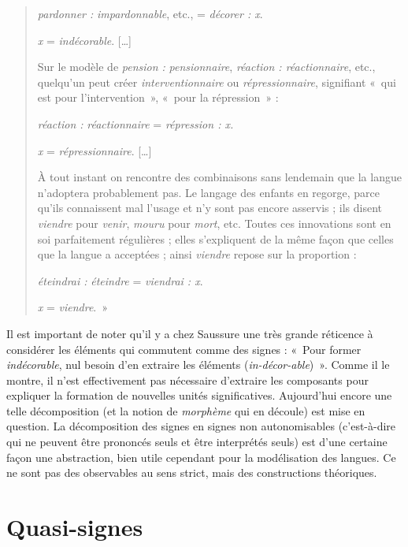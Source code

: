 {\begin{quote}
        \textit{pardonner :} \textit{impardonnable}, etc., = \textit{décorer : x}.

        \textit{x} = \textit{indécorable}. […]

    Sur le modèle de \textit{pension :} \textit{pensionnaire}, \textit{réaction : réactionnaire}, etc., quelqu’un peut créer \textit{interventionnaire} ou \textit{répressionnaire}, signifiant «~qui est pour l’intervention~», «~pour la répression~» :

        \textit{réaction :} \textit{réactionnaire} = \textit{répression : x.}

        \textit{x} = \textit{répressionnaire}. […]

    À tout instant on rencontre des combinaisons sans lendemain que la langue n’adoptera probablement pas. Le langage des enfants en regorge, parce qu’ils connaissent mal l’usage et n’y sont pas encore asservis ; ils disent \textit{viendre} pour \textit{venir}, \textit{mouru} pour \textit{mort}, etc. Toutes ces innovations sont en soi parfaitement régulières ; elles s’expliquent de la même façon que celles que la langue a acceptées ; ainsi \textit{viendre} repose sur la proportion :

    \textit{éteindrai :} \textit{éteindre} = \textit{viendrai : x}.

    \textit{x} = \textit{viendre}.~»
    \end{quote}

    Il est important de noter qu’il y a chez Saussure une très grande réticence à considérer les éléments qui commutent comme des signes : «~Pour former \textit{indécorable}, nul besoin d’en extraire les éléments (\textit{in-décor-able})~». Comme il le montre, il n’est effectivement pas nécessaire d’extraire les composants pour expliquer la formation de nouvelles unités significatives. Aujourd’hui encore une telle décomposition (et la notion de \textit{morphème} qui en découle) est mise en question. La décomposition des signes en signes non autonomisables (c’est-à-dire qui ne peuvent être prononcés seuls et être interprétés seuls) est d’une certaine façon une abstraction, bien utile cependant pour la modélisation des langues. Ce ne sont pas des observables au sens strict, mais des constructions théoriques.
}
\section{Quasi-signes}\label{sec:2.2.4}

